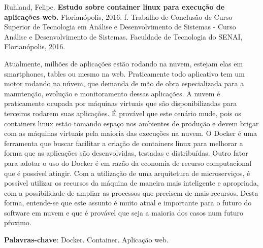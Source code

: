 
\noindent
Ruhland, Felipe. \textbf{Estudo sobre container linux para execução de aplicações web.}
Florianópolis, 2016. \pageref{nropaginas}f. Trabalho de Conclusão de Curso Superior de Tecnologia em
Análise e Desenvolvimento de Sistemas - Curso Análise e Desenvolvimento de Sistemas. Faculdade de Tecnologia do
SENAI, Florianópolis, 2016.

\vspace{1cm}
\setlength{\absparsep}{18pt} %
\begin{resumo}
Atualmente, milhões de aplicações estão rodando na nuvem, estejam elas em smartphones, tables ou mesmo na web. Praticamente todo aplicativo tem um motor rodando na núvem, que demanda de mão de obra especializada para a manutenção, evolução e monitoramento dessas aplicações. A nuvem é praticamente ocupada por máquinas virtuais que são disponibilizadas para terceiros rodarem suas aplicações. É provável que este cenário mude, pois os containers linux estão tomando espaço nos ambientes de produção e devem brigar com as máquinas virtuais pela maioria das execuções na nuvem. O Docker é uma ferramenta que buscar facilitar a criação de containers linux para melhorar a forma que as aplicações são desenvolvidas, testadas e distribuídas. Outro fator para adotar o uso do Docker é em razão da economia de recurso computacional que é possível atingir. Com a utilização de uma arquitetura de microserviços, é possível utilizar os recursos da máquina de maneira mais inteligente e apropriada, com a possibilidade de ampliar as processos que precisem de mais recursos. Desta forma, entende-se que este assunto é muito atual e importante para o futuro do software em nuvem e que é provável que seja a maioria dos casos num futuro pŕoximo.

 \textbf{Palavras-chave}: Docker. Container. Aplicação web.
\end{resumo}
